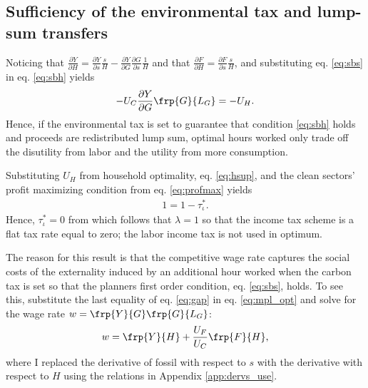 \subsection{Sufficiency of the environmental tax and lump-sum transfers}\label{app:incometax0}

Noticing that $\frac{\partial Y}{\partial H}= \frac{\partial Y}{\partial s}\frac{s}{H}-\frac{\partial Y}{\partial G}\frac{\partial G}{\partial s}\frac{1}{H}$ and that $\frac{\partial F}{\partial H}=\frac{\partial F}{\partial s}\frac{s}{H}$, and substituting eq. \eqref{eq:sbs} in eq. \eqref{eq:sbh} yields
\begin{align}\label{eq:pigou}
-U_C \frac{\partial Y}{\partial G}\frp{G}{L_G}=-U_H.
\end{align}
Hence, if the environmental tax is set to guarantee that condition \eqref{eq:sbh} holds and proceeds are redistributed lump sum, optimal hours worked only trade off the disutility from labor and the utility from more consumption. 

Substituting $U_H$ from household optimality, eq. \eqref{eq:hsup}, and the clean sectors' profit maximizing condition from eq. \eqref{eq:profmax} yields
\begin{align}
1=1-\tau^*_\iota.\nonumber
\end{align}
Hence, $\tau^*_\iota =0$ from which follows that $\lambda =1$ so that the income tax scheme is a flat tax rate equal to zero; the labor income tax is not used in optimum.


The reason for this result is that the competitive wage rate captures the social costs of the externality induced by an additional hour worked when the carbon tax is set so that the planners first order condition, eq. \eqref{eq:sbs}, holds. 
To see this, substitute the last equality of eq. \eqref{eq:gap}
in eq. \eqref{eq:mpl_opt} and solve for the wage rate $w= \frp{Y}{G}\frp{G}{L_G}$:
\begin{align}
w= \frp{Y}{H}+\frac{U_F}{U_C}\frp{F}{H},
\end{align}
where I replaced the derivative of fossil with respect to $s$ with the derivative with respect to $H$ using the relations in Appendix \ref{app:dervs_use}. 
%
